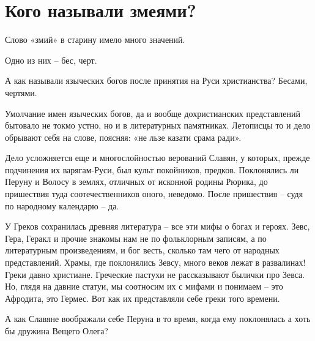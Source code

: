 \chapter{Кого называли змеями?}

Слово «змий» в старину имело много значений.

Одно из них – бес, черт.

А как называли языческих богов после принятия на Руси христианства? Бесами, чертями. 

Умолчание имен языческих богов, да и вообще дохристианских представлений бытовало не токмо устно, но и в литературных памятниках. Летописцы то и дело обрывают себя на слове, поясняя: «не льзе казати срама ради».

Дело усложняется еще и многослойностью верований Славян, у которых, прежде подчинения их варягам-Руси, был культ покойников, предков. Поклонялись ли Перуну и Волосу в землях, отличных от исконной родины Рюрика, до пришествия туда соотечественников оного, неведомо. После пришествия – судя по народному календарю – да.

У Греков сохранилась древняя литература – все эти мифы о богах и героях. Зевс, Гера, Геракл и прочие знакомы нам не по фольклорным записям, а по литературным произведениям, и бог весть, сколько там чего от народных представлений. Храмы, где поклонялись Зевсу, много веков лежат в развалинах! Греки давно христиане. Греческие пастухи не рассказывают былички про Зевса. Но, глядя на давние статуи, мы соотносим их с мифами и понимаем – это Афродита, это Гермес. Вот как их представляли себе греки того времени.

А как Славяне воображали себе Перуна в то время, когда ему поклонялась а хоть бы дружина Вещего Олега?






